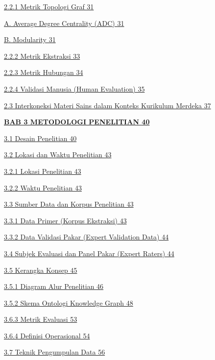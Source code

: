 \documentclass[
]{article}
\begin{document}
\protect\hyperlink{metrik-topologi-graf}{2.2.1 Metrik Topologi Graf 31}

\protect\hyperlink{average-degree-centrality-adc}{A. Average Degree
Centrality (ADC) 31}

\protect\hyperlink{modularity}{B. Modularity 31}

\protect\hyperlink{metrik-ekstraksi}{2.2.2 Metrik Ekstraksi 33}

\protect\hyperlink{_n5tbkf1zfscn}{2.2.3 Metrik Hubungan 34}

\protect\hyperlink{validasi-manusia-human-evaluation}{2.2.4 Validasi
Manusia (Human Evaluation) 35}

\protect\hyperlink{interkoneksi-materi-sains-dalam-konteks-kurikulum-merdeka}{2.3
Interkoneksi Materi Sains dalam Konteks Kurikulum Merdeka 37}

\protect\hyperlink{metodologi-penelitian}{\textbf{BAB 3 METODOLOGI
PENELITIAN 40}}

\protect\hyperlink{desain-penelitian}{3.1 Desain Penelitian 40}

\protect\hyperlink{lokasi-dan-waktu-penelitian}{3.2 Lokasi dan Waktu
Penelitian 43}

\protect\hyperlink{lokasi-penelitian}{3.2.1 Lokasi Penelitian 43}

\protect\hyperlink{waktu-penelitian}{3.2.2 Waktu Penelitian 43}

\protect\hyperlink{sumber-data-dan-korpus-penelitian}{3.3 Sumber Data
dan Korpus Penelitian 43}

\protect\hyperlink{data-primer-korpus-ekstraksi}{3.3.1 Data Primer
(Korpus Ekstraksi) 43}

\protect\hyperlink{data-validasi-pakar-expert-validation-data}{3.3.2
Data Validasi Pakar (Expert Validation Data) 44}

\protect\hyperlink{subjek-evaluasi-dan-panel-pakar-expert-raters}{3.4
Subjek Evaluasi dan Panel Pakar (Expert Raters) 44}

\protect\hyperlink{kerangka-konsep}{3.5 Kerangka Konsep 45}

\protect\hyperlink{diagram-alur-penelitian}{3.5.1 Diagram Alur
Penelitian 46}

\protect\hyperlink{skema-ontologi-knowledge-graph}{3.5.2 Skema Ontologi
Knowledge Graph 48}

\protect\hyperlink{metrik-evaluasi}{3.6.3 Metrik Evaluasi 53}

\protect\hyperlink{definisi-operasional}{3.6.4 Definisi Operasional 54}

\protect\hyperlink{teknik-pengumpulan-data}{3.7 Teknik Pengumpulan Data
56}
\end{document}
